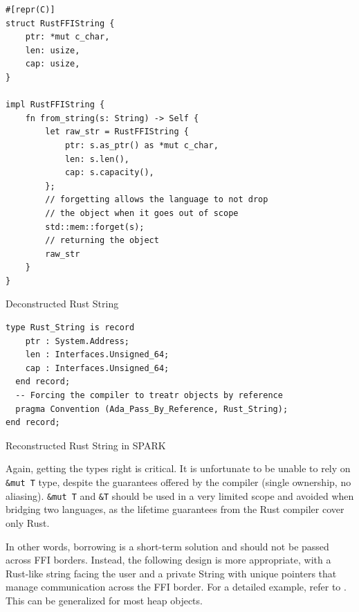 \documentclass[nomenclature, english, bibtex]{kththesis}
\begin{document}
{\begin{listing}[!ht]
\begin{verbatim}
#[repr(C)]
struct RustFFIString {
    ptr: *mut c_char,
    len: usize,
    cap: usize,
}

impl RustFFIString {
    fn from_string(s: String) -> Self {
        let raw_str = RustFFIString {
            ptr: s.as_ptr() as *mut c_char,
            len: s.len(),
            cap: s.capacity(),
        };
        // forgetting allows the language to not drop 
        // the object when it goes out of scope
        std::mem::forget(s);
        // returning the object
        raw_str
    }
}

\end{verbatim}
\caption[Deconstructed Rust String]{Deconstructed Rust String}
\label{lst:deconstructed_rust_string}
\end{listing}
\FloatBarrier

\begin{listing}[!ht]
\begin{verbatim}
type Rust_String is record
    ptr : System.Address;
    len : Interfaces.Unsigned_64;
    cap : Interfaces.Unsigned_64;
  end record;
  -- Forcing the compiler to treatr objects by reference
  pragma Convention (Ada_Pass_By_Reference, Rust_String);
end record;
\end{verbatim}
\caption[Reconstructed Rust String]{Reconstructed Rust String in SPARK}
\label{lst:reconstructed_rust_string}
\end{listing}
\FloatBarrier

Again, getting the types right is critical. It is unfortunate to be unable to rely on \texttt{\&mut T} type, despite the guarantees offered by the compiler (single ownership, no aliasing). \texttt{\&mut T} and \texttt{\&T} should be used in a very limited scope and avoided when bridging two languages, as the lifetime guarantees from the Rust compiler cover only Rust. 

In other words, borrowing is a short-term solution and should not be passed across FFI borders. Instead, the following design  is more appropriate, with a Rust-like string facing the user and a private String with unique pointers that manage communication across the FFI border. For a detailed example, refer to .
This can be generalized for most heap objects.


}
\end{document}

